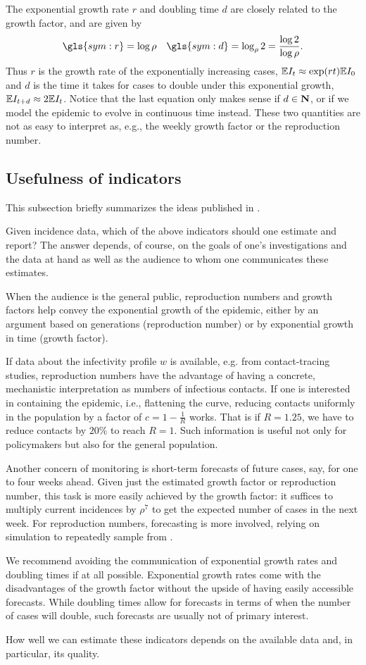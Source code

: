 The exponential growth rate $r$ and doubling time $d$ are closely related to the growth factor, and are given by 
\begin{align*}
    \gls{sym:r} = \log \rho && \gls{sym:d} = \log_{\rho} 2 = \frac{\log 2}{\log \rho}.
\end{align*}
Thus $r$ is the growth rate of the exponentially increasing cases, $\mathbb E I_{t} \approx \exp(rt) \mathbb E I_{0}$ and $d$ is the time it takes for cases to double under this exponential growth, $\mathbb E I_{t + d} \approx 2\mathbb E I_{t}$. Notice that the last equation only makes sense if $d \in \mathbf N$, or if we model the epidemic to evolve in continuous time instead. These two quantities are not as easy to interpret as, e.g., the weekly growth factor or the reproduction number. 

\subsection{Usefulness of indicators}
\label{subsec:usefulness_of_indicators}
This subsection briefly summarizes the ideas published in \citep{Heyder2023Measures}.

Given incidence data, which of the above indicators should one estimate and report? The answer depends, of course, on the goals of one's investigations and the data at hand as well as the audience to whom one communicates these estimates. 

When the audience is the general public, reproduction numbers and growth factors help convey the exponential growth of the epidemic, either by an argument based on generations (reproduction number) or by exponential growth in time (growth factor).

If data about the infectivity profile $w$ is available, e.g. from contact-tracing studies, reproduction numbers have the advantage of having a concrete, mechanistic interpretation as numbers of infectious contacts. If one is interested in containing the epidemic, i.e., \glqq{}flattening the curve\grqq{}, reducing contacts uniformly in the population by a factor of $c = 1 - \frac{1}{R}$ works. That is if $R = 1.25$, we have to reduce contacts by $20\%$ to reach $R = 1$. Such information is useful not only for policymakers but also for the general population. 

Another concern of monitoring is short-term forecasts of future cases, say, for one to four weeks ahead. Given just the estimated growth factor or reproduction number, this task is more easily achieved by the growth factor: it suffices to multiply current incidences by $\rho^{7}$ to get the expected number of cases in the next week. For reproduction numbers, forecasting is more involved, relying on simulation to repeatedly sample from .

We recommend avoiding the communication of exponential growth rates and doubling times if at all possible. Exponential growth rates come with the disadvantages of the growth factor without the upside of having easily accessible forecasts. While doubling times allow for forecasts in terms of when the number of cases will double, such forecasts are usually not of primary interest. 

How well we can estimate these indicators depends on the available data and, in particular, its quality.